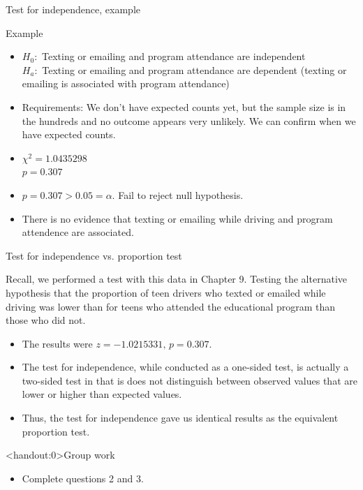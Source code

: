 \documentclass[xcolor=table]{beamer}
\begin{document}
\begin{frame}{Test for independence, example}
\begin{exampleblock}{Example}
\large
\begin{itemize}
\pause\item $H_0:$ Texting or emailing and program attendance are independent\\
$H_a:$ Texting or emailing and program attendance are dependent (texting or emailing is associated with program attendance)
\pause\item Requirements: We don't have expected counts yet, but the sample size is in the hundreds and no outcome appears very unlikely. We can confirm when we have expected counts.
\pause\item $\chi^2 = 1.0435298$\\
$p = 0.307 $
\pause\item $p = 0.307 > 0.05 = \alpha$. Fail to reject null hypothesis.
\pause\item There is no evidence that texting or emailing while driving and program attendence are associated.
\end{itemize}
\end{exampleblock}
\end{frame}

\begin{frame}{Test for independence vs. proportion test}
\begin{block}{}
\large
Recall, we performed a test with this data in Chapter 9. Testing the alternative hypothesis that the proportion of teen drivers who texted or emailed while driving was lower than for teens who attended the educational program than those who did not. \\
\begin{itemize}
\pause\item The results were $z = -1.0215331, \, p = 0.307$.\\
\pause\item The test for independence, while conducted as a one-sided test, is actually a two-sided test in that is does not distinguish between observed values that are lower or higher than expected values.\\
\pause\item Thus, the test for independence gave us identical results as the equivalent proportion test.
\end{itemize}
\end{block}
\end{frame}


\begin{frame}<handout:0>{Group work}
\begin{block}{}
\large
\begin{itemize}
\item Complete questions 2 and 3.
\end{itemize}
\end{block}
\end{frame}
\end{document}
